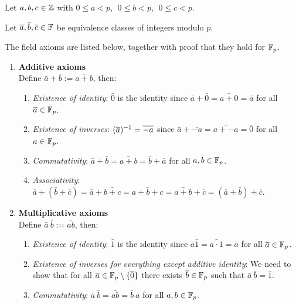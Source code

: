 \documentclass[12pt]{article}
\begin{document}
\begin{mdframed}
  Let $a, b, c \in \mathbb{Z}$ with $0 \leq a < p, ~~ 0 \leq b < p, ~~ 0 \leq c < p$.

  Let $\overline a, \overline b, \overline c \in \mathbb{F}$ be equivalence classes of integers modulo $p$.

  The field axioms are listed below, together with proof that they hold for $\mathbb{F}_p$.
  \begin{enumerate}
  \item \textbf{Additive axioms}\\
    Define $\bar a + \bar b := \bar{a + b}$, then:
    \begin{enumerate}
    \item \textit{Existence of identity}: $\bar 0$ is the identity since
      $\bar a + \bar 0 = \bar{a + 0} = \bar{a}$ for all $\overline a \in \mathbb{F}_p$.
    \item \textit{Existence of inverses}: $(\overline a)^{-1} = \overline{-a}$ since
      $\bar a + \bar{-a} = \bar{a + -a} = \bar{0}$ for all $a \in \mathbb{F}_p$.
    \item \textit{Commutativity}:
      $\bar a + \bar b = \bar{a + b} = \bar{b} + \bar{a}$ for all $a, b \in \mathbb{F}_p$.
    \item \textit{Associativity}:
      $\bar a + (\bar b + \bar c) = \bar a + \bar {b + c} = \bar{a + b + c} =
      \bar{a + b} + \bar{c} = (\bar a + \bar b) + \bar{c}$.
    \end{enumerate}
  \item \textbf{Multiplicative axioms}\\
    Define $\bar a ~ \bar b := \bar{ab}$, then:
    \begin{enumerate}
    \item \textit{Existence of identity}: $\bar 1$ is the identity since
      $\bar a \bar 1 = \bar{a\cdot 1} = \bar{a}$ for all $\overline a \in \mathbb{F}_p$.
    \item \textit{Existence of inverses for everything except additive
        identity}: We need to show that for all
      $\overline a \in \mathbb{F}_p \setminus \{\overline 0\}$ there exists $\overline b \in \mathbb{F}_p$
      such that $\bar a ~ \bar b = \bar 1$. 
    \item \textit{Commutativity}:
      $\bar a ~ \bar b = \bar{ab} = \bar{b} ~ \bar{a}$ for all $a, b \in \mathbb{F}_p$.

\end{enumerate}
\end{enumerate}
\end{mdframed}
\end{document}
